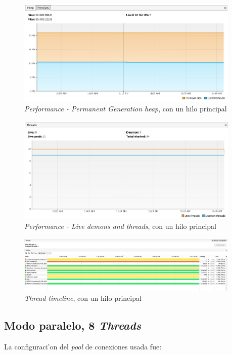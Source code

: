 \begin{figure}[H]
\centering
\includegraphics[width=0.95\textwidth]{images/Performance_PERM_1_Threads}
\caption{\emph{Performance - Permanent Generation heap}, con un hilo principal}
\label{fig:6.10}
\end{figure}

\begin{figure}[H]
\centering
\includegraphics[width=0.95\textwidth]{images/Performance_LIVE_1_Threads}
\caption{\emph{Performance - Live demons and threads}, con un hilo principal}
\label{fig:6.11}
\end{figure}

\begin{figure}[H]
\centering
\includegraphics[width=0.95\textwidth]{images/Running_Time_1_Threads}
\caption{\emph{Thread timeline}, con un hilo principal}
\label{fig:6.12}
\end{figure}

\subsection{Modo paralelo, 8 \emph{Threads}}
\noindent
La configuraci'on del \emph{pool} de conexiones usada fue: \\

